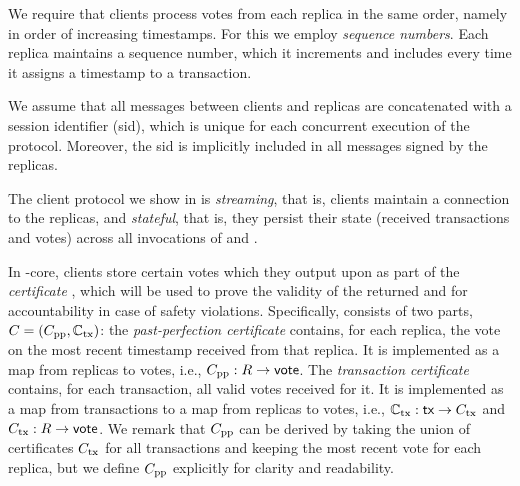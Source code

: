
\begin{remark}
    We require that clients process votes from each replica in the same order, namely in order of increasing timestamps. For this we employ \emph{sequence numbers}. Each replica maintains a sequence number, which it increments and includes every time it assigns a timestamp to a transaction.
\end{remark}
\begin{remark}
We assume that all messages between clients and replicas are concatenated with a session identifier (sid), which is unique for each concurrent execution of the protocol. Moreover, the sid is implicitly included in all messages signed by the replicas.
\end{remark}
\begin{remark}
    The client protocol we show in  is \emph{streaming}, that is, clients maintain a connection to the replicas, and \emph{stateful}, that is, they persist their state (received transactions and votes) across all invocations of \opwrite{} and \opreadall{}.
\end{remark}

In \podtm-core, clients store certain votes which they output upon \opreadall{} as part of the \emph{certificate} \cert, which will be used to prove the validity of the returned \Pod and for accountability in case of safety violations.
Specifically, \cert consists of two parts, $C = (C_\text{pp}, \mathbb{C}_\text{tx})$: the \emph{past-perfection certificate} \ppcert contains, for each replica, the vote on the most recent timestamp received from that replica. It is implemented as a map from replicas to votes, i.e., $C_\text{pp}: R \rightarrow \textsf{vote}$.
The \emph{transaction certificate} \alltxcert contains, for each transaction, all valid votes received for it.
It is implemented as a map from transactions to a map from replicas to votes, i.e., $\mathbb{C}_\text{tx}: \textsf{tx} \rightarrow C_\text{tx}$ and $C_\text{tx}: R \rightarrow \textsf{vote}$.
We remark that $C_\text{pp}$ can be derived by taking the union of certificates $C_\text{tx}$ for all transactions and keeping the most recent vote for each replica, but we define $C_\text{pp}$ explicitly for clarity and readability.

